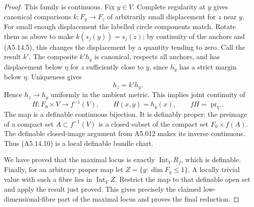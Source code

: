 \begin{proof}
This family is continuous.  Fix $y\in V$.  Complete regularity
at $y$ gives canonical comparisons $k:F_y\to F_z$ of
arbitrarily small displacement for $z$ near $y$.  For small
enough displacement the labelled circle components match.
Rotate them as above to make $k(s_j(y))=s_j(z)$; by continuity
of the anchors and (A5.14.5), this changes the displacement
by a quantity tending to zero.  Call the result $k'$.  The
composite $k'h_y$ is canonical, respects all anchors, and has
displacement below $\eta$ for $z$ sufficiently close to $y$,
since $h_y$ has a strict margin below $\eta$.  Uniqueness gives
\[
                             h_z=k'h_y.
\]
Hence $h_z\to h_y$ uniformly in the ambient metric.  This
implies joint continuity of
\[
 H:F_0\times V\longrightarrow f^{-1}(V),\qquad
 H(x,y)=h_y(x),\qquad fH=\operatorname{pr}_V.
 \tag{A5.14.10}
\]
The map is a definable continuous bijection.  It is definably
proper: the preimage of a compact set $A\subset f^{-1}(V)$
is a closed subset of the compact set $F_0\times f(A)$.
The definable closed-image argument from A5.012 makes its
inverse continuous.  Thus (A5.14.10) is a local definable
bundle chart.

We have proved that the maximal locus is exactly
$\operatorname{Int}_Y R_f$, which is definable.  Finally,
for an arbitrary proper map let
$Z=\{y:\dim F_y\leq1\}$.  A locally trivial value with such
a fibre lies in $\operatorname{Int}_Y Z$.  Restrict the map
to that definable open set and apply the result just proved.
This gives precisely the claimed low-dimensional-fibre part
of the maximal locus and proves the final reduction.
\end{proof}
